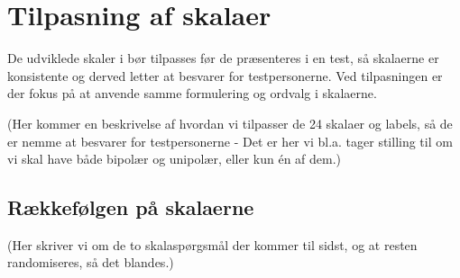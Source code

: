 \chapter{Tilpasning af skalaer}
\label{TestAfSkalaTilpasningAfSkalaer}
%
De udviklede skaler i  bør tilpasses før de præsenteres i en test, så skalaerne er konsistente og derved letter at besvarer for testpersonerne. \blankline
%
Ved tilpasningen er der fokus på at anvende samme formulering og ordvalg i skalaerne.

(Her kommer en beskrivelse af hvordan vi tilpasser de 24 skalaer og labels, så de er nemme at besvarer for testpersonerne - Det er her vi bl.a. tager stilling til om vi skal have både bipolær og unipolær, eller kun én af dem.) 

\section{Rækkefølgen på skalaerne}
(Her skriver vi om de to skalaspørgsmål der kommer til sidst, og at resten randomiseres, så det blandes.)


